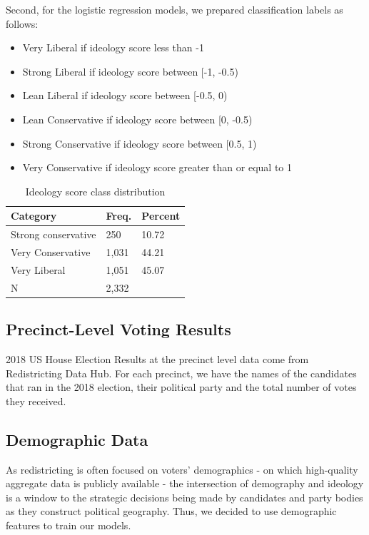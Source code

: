\documentclass{article}
\begin{document}
Second, for the logistic regression models, we prepared classification labels as follows:

\begin{itemize}
    \item Very Liberal if ideology score less than -1
    \item Strong Liberal if ideology score between [-1, -0.5)
    \item Lean Liberal if ideology score between [-0.5, 0)
    \item Lean Conservative if ideology score between [0, -0.5)
    \item Strong Conservative if ideology score between [0.5, 1)
    \item Very Conservative if ideology score greater than or equal to 1
\end{itemize}


\begin{table}
  \caption{Ideology score class distribution}
  \label{ideologytable}
  \centering
    \begin{tabular}{lll}
    \hline
    Category            & Freq. & Percent \\
    \hline
    Strong conservative & 250   & 10.72   \\
    Very Conservative   & 1,031 & 44.21   \\
    Very Liberal        & 1,051 & 45.07   \\
    \hline
    N                   & 2,332 &    
    \end{tabular}
\end{table}

\subsection{Precinct-Level Voting Results}


2018 US House Election Results at the precinct level data come from Redistricting Data Hub. 
For each precinct, we have the names of the candidates that ran in the 2018 election, 
their political party and the total number of votes they received.



\subsection{Demographic Data}


As redistricting is often focused on voters’ demographics - on which high-quality aggregate data is publicly available -  the intersection of demography and ideology is a window to the strategic decisions being made by candidates and party bodies as they construct political geography. Thus, we decided to use demographic features to train our models.
\end{document}
